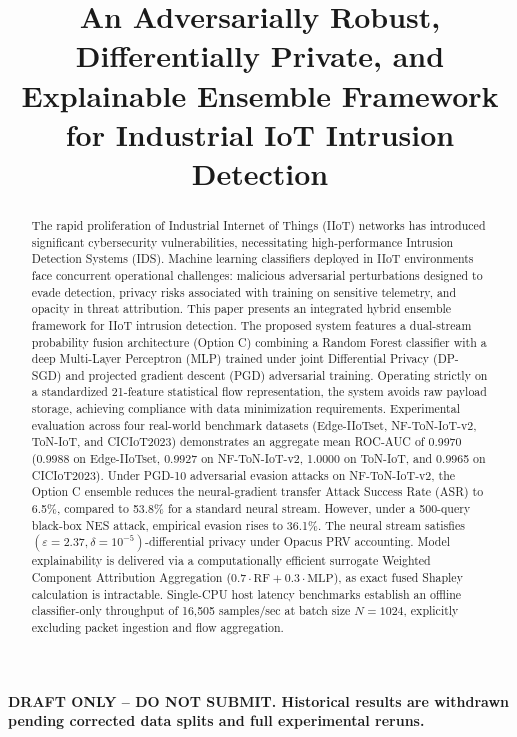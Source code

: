 \documentclass[10pt,journal,compsoc,twocolumn]{IEEEtran}
\begin{document}
\title{An Adversarially Robust, Differentially Private, and Explainable Ensemble Framework for Industrial IoT Intrusion Detection}


\maketitle

\begin{center}
\textbf{\color{red}DRAFT ONLY -- DO NOT SUBMIT. Historical results are withdrawn pending corrected data splits and full experimental reruns.}
\end{center}

\begin{abstract}
The rapid proliferation of Industrial Internet of Things (IIoT) networks has introduced significant cybersecurity vulnerabilities, necessitating high-performance Intrusion Detection Systems (IDS). Machine learning classifiers deployed in IIoT environments face concurrent operational challenges: malicious adversarial perturbations designed to evade detection, privacy risks associated with training on sensitive telemetry, and opacity in threat attribution. This paper presents an integrated hybrid ensemble framework for IIoT intrusion detection. The proposed system features a dual-stream probability fusion architecture (Option C) combining a Random Forest classifier with a deep Multi-Layer Perceptron (MLP) trained under joint Differential Privacy (DP-SGD) and projected gradient descent (PGD) adversarial training. Operating strictly on a standardized 21-feature statistical flow representation, the system avoids raw payload storage, achieving compliance with data minimization requirements. Experimental evaluation across four real-world benchmark datasets (Edge-IIoTset, NF-ToN-IoT-v2, ToN-IoT, and CICIoT2023) demonstrates an aggregate mean ROC-AUC of 0.9970 (0.9988 on Edge-IIoTset, 0.9927 on NF-ToN-IoT-v2, 1.0000 on ToN-IoT, and 0.9965 on CICIoT2023). Under PGD-10 adversarial evasion attacks on NF-ToN-IoT-v2, the Option C ensemble reduces the neural-gradient transfer Attack Success Rate (ASR) to 6.5\%, compared to 53.8\% for a standard neural stream. However, under a 500-query black-box NES attack, empirical evasion rises to 36.1\%. The neural stream satisfies $(\varepsilon=2.37, \delta=10^{-5})$-differential privacy under Opacus PRV accounting. Model explainability is delivered via a computationally efficient surrogate Weighted Component Attribution Aggregation ($0.7 \cdot \text{RF} + 0.3 \cdot \text{MLP}$), as exact fused Shapley calculation is intractable. Single-CPU host latency benchmarks establish an offline classifier-only throughput of 16,505 samples/sec at batch size $N=1024$, explicitly excluding packet ingestion and flow aggregation.
\end{abstract}
\end{document}

